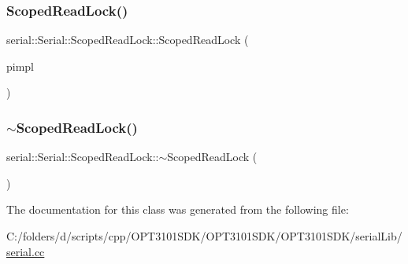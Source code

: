 \subsubsection{\texorpdfstring{Scoped\+Read\+Lock()}{ScopedReadLock()}}
{\footnotesize\ttfamily serial\+::\+Serial\+::\+Scoped\+Read\+Lock\+::\+Scoped\+Read\+Lock (\begin{DoxyParamCaption}\item[{Serial\+Impl $\ast$}]{pimpl }\end{DoxyParamCaption})\hspace{0.3cm}{\ttfamily [inline]}}

\mbox{\label{class_serial_1_1_scoped_read_lock_a5c061909b95231cec776c40094c878b4}} 
\subsubsection{\texorpdfstring{$\sim$\+Scoped\+Read\+Lock()}{~ScopedReadLock()}}
{\footnotesize\ttfamily serial\+::\+Serial\+::\+Scoped\+Read\+Lock\+::$\sim$\+Scoped\+Read\+Lock (\begin{DoxyParamCaption}{ }\end{DoxyParamCaption})\hspace{0.3cm}{\ttfamily [inline]}}



The documentation for this class was generated from the following file\+:\begin{DoxyCompactItemize}
\item 
C\+:/folders/d/scripts/cpp/\+O\+P\+T3101\+S\+D\+K/\+O\+P\+T3101\+S\+D\+K/\+O\+P\+T3101\+S\+D\+K/serial\+Lib/\mbox{\hyperlink{serial_8cc}{serial.\+cc}}\end{DoxyCompactItemize}
